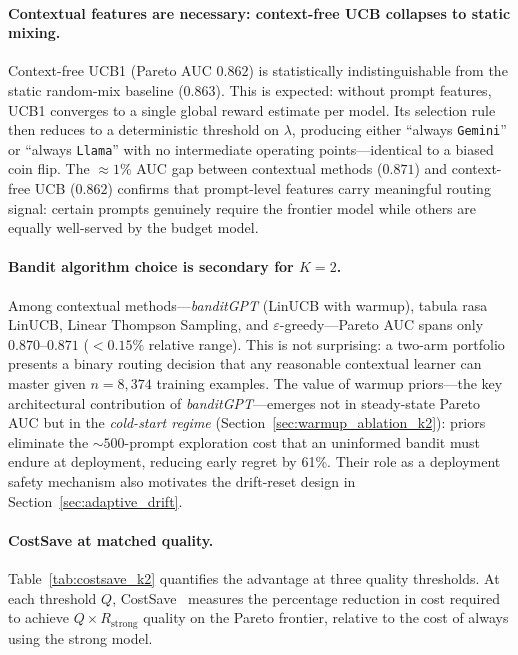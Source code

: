 \paragraph{Contextual features are necessary: context-free UCB collapses
to static mixing.}
Context-free UCB1 (Pareto AUC $0.862$) is statistically
indistinguishable from the static random-mix baseline ($0.863$).
This is expected: without prompt features, UCB1 converges to
a single global reward estimate per model.  Its selection rule
then reduces to a deterministic threshold on $\lambda$, producing
either ``always \texttt{Gemini}'' or ``always \texttt{Llama}''
with no intermediate operating points---identical to a biased
coin flip.
The ${\approx}1\%$ AUC gap between contextual methods ($0.871$)
and context-free UCB ($0.862$) confirms that prompt-level
features carry meaningful routing signal: certain prompts genuinely
require the frontier model while others are equally well-served by
the budget model.

\paragraph{Bandit algorithm choice is secondary for $K{=}2$.}
Among contextual methods---\textit{banditGPT} (LinUCB with warmup),
tabula rasa LinUCB, Linear Thompson Sampling, and
$\varepsilon$-greedy---Pareto AUC spans only $0.870$--$0.871$
($<0.15\%$ relative range).
This is not surprising: a two-arm portfolio presents a binary
routing decision that any reasonable contextual learner can master
given $n{=}8{,}374$ training examples.
The value of warmup priors---the key architectural contribution of
\textit{banditGPT}---emerges not in steady-state Pareto AUC but in
the \emph{cold-start regime} (Section~\ref{sec:warmup_ablation_k2}):
priors eliminate the ${\sim}500$-prompt exploration cost that an
uninformed bandit must endure at deployment, reducing early regret
by 61\%.  Their role as a deployment safety mechanism also motivates
the drift-reset design in Section~\ref{sec:adaptive_drift}.

\paragraph{CostSave at matched quality.}
Table~\ref{tab:costsave_k2} quantifies the advantage at three
quality thresholds.  At each threshold $Q$,
CostSave~\cite{li2026llmrouterbench, chen2023frugalgpt} measures the
percentage reduction in cost required to achieve
$Q \times R_{\text{strong}}$ quality on the Pareto frontier, relative
to the cost of always using the strong model.

